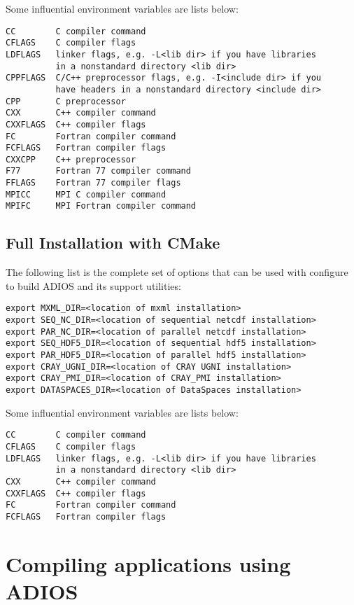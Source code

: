 Some influential environment variables are lists below:

\begin{lstlisting}
CC        C compiler command
CFLAGS    C compiler flags
LDFLAGS   linker flags, e.g. -L<lib dir> if you have libraries
          in a nonstandard directory <lib dir>
CPPFLAGS  C/C++ preprocessor flags, e.g. -I<include dir> if you
          have headers in a nonstandard directory <include dir>
CPP       C preprocessor
CXX       C++ compiler command
CXXFLAGS  C++ compiler flags
FC        Fortran compiler command
FCFLAGS   Fortran compiler flags
CXXCPP    C++ preprocessor
F77       Fortran 77 compiler command
FFLAGS    Fortran 77 compiler flags
MPICC     MPI C compiler command
MPIFC     MPI Fortran compiler command
\end{lstlisting}

\subsection{Full Installation with CMake}

The following list is the complete set of options that can be used with configure to build ADIOS and its support utilities:

\begin{lstlisting}
export MXML_DIR=<location of mxml installation>
export SEQ_NC_DIR=<location of sequential netcdf installation>
export PAR_NC_DIR=<location of parallel netcdf installation>
export SEQ_HDF5_DIR=<location of sequential hdf5 installation>
export PAR_HDF5_DIR=<location of parallel hdf5 installation>
export CRAY_UGNI_DIR=<location of CRAY UGNI installation>
export CRAY_PMI_DIR=<location of CRAY_PMI installation>
export DATASPACES_DIR=<location of DataSpaces installation>
\end{lstlisting}

Some influential environment variables are lists below:
\begin{lstlisting}
CC        C compiler command
CFLAGS    C compiler flags
LDFLAGS   linker flags, e.g. -L<lib dir> if you have libraries
          in a nonstandard directory <lib dir>
CXX       C++ compiler command
CXXFLAGS  C++ compiler flags
FC        Fortran compiler command
FCFLAGS   Fortran compiler flags
\end{lstlisting}

\section{Compiling applications using ADIOS}
\label{section:installation_compiling_apps}

